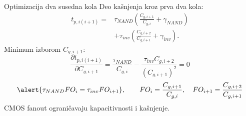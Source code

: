 \begin{frame}[label=09_3-s041]{Optimizacija dva susedna kola}
Deo kašnjenja kroz prva dva kola:
\[\begin{aligned}
t_{p,i(i+1)}={}&\tau_{NAND}\left(\frac{C_{g,i+1}}{C_{g,i}}+\gamma_{NAND}\right)\\
&+\tau_{inv}\left(\frac{C_{g,i+2}}{C_{g,i+1}}+\gamma_{inv}\right).
\end{aligned}\]
Minimum izborom $C_{g,i+1}$:
\[\frac{\partial t_{p,i(i+1)}}{\partial C_{g,i+1}}
=\frac{\tau_{NAND}}{C_{g,i}}-\frac{\tau_{inv}C_{g,i+2}}{(C_{g,i+1})^2}=0\]
\[\alert{\tau_{NAND}FO_i=\tau_{inv}FO_{i+1}},\qquad
FO_i=\frac{C_{g,i+1}}{C_{g,i}},\quad FO_{i+1}=\frac{C_{g,i+2}}{C_{g,i+1}}\]
CMOS fanout ograničavaju kapacitivnosti i kašnjenje.
\end{frame}
